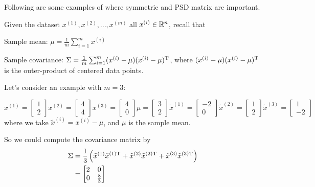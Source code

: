 \vspace{0.3cm}
Following are some examples of where symmetric and PSD matrix are important.

\begin{example} Given the dataset $x^{(1)}, x^{(2)}, ..., x^{(m)}$ all $x^{(i)}\in \mathbb{R}^n$, recall that

Sample mean: $\mu = \frac{1}{m}\sum^m_{i=1}x^{(i)}$

Sample covariance: $\Sigma = \frac{1}{m}\sum^m_{i=1}(x^{(i)}-\mu)(x^{(i)}-\mu)^{{\rm T}}$, where $(x^{(i)}-\mu)(x^{(i)}-\mu)^{{\rm T}}$ is the outer-product of centered data points.

Let's consider an example with $m=3$:

$$x^{(1)} =
\left[
\begin{matrix}
1\\
2
\end{matrix}
\right]x^{(2)} =
\left[
\begin{matrix}
4\\
4
\end{matrix}
\right]x^{(3)} =
\left[
\begin{matrix}
4\\
0
\end{matrix}
\right]\mu =
\left[
\begin{matrix}
3\\
2
\end{matrix}
\right]\tilde{x}^{(1)} =
\left[
\begin{matrix}
-2\\
0
\end{matrix}
\right]\tilde{x}^{(2)} =
\left[
\begin{matrix}
1\\
2
\end{matrix}
\right]\tilde{x}^{(3)} =
\left[
\begin{matrix}
1\\
-2
\end{matrix}
\right]
$$
where we take $\tilde{x}^{(i)}=x^{(i)}-\mu$, and $\mu$ is the sample mean.

So we could compute the covariance matrix by
\begin{align*}
\Sigma &= \frac{1}{3} \left(\tilde{x}^{(1)}\tilde{x}^{(1){\rm T}}+\tilde{x}^{(2)}\tilde{x}^{(2){\rm T}}    +\tilde{x}^{(3)}\tilde{x}^{(3){\rm T}}\right)\\
&= \left[
\begin{matrix}
2&0\\
0&\frac{8}{3}
\end{matrix}
\right]
\end{align*}


\end{example}
